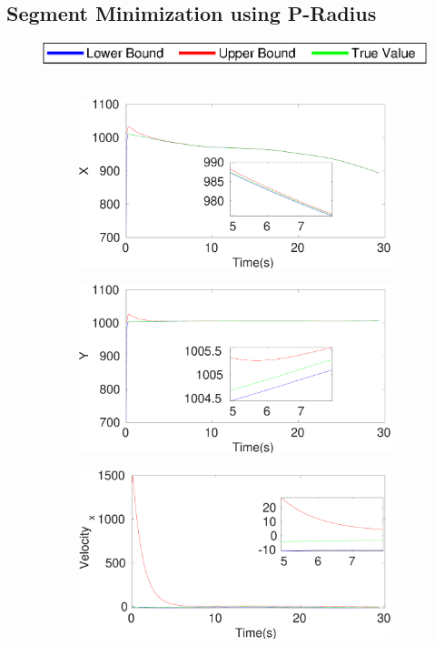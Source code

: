 \clearpage
\subsection{Segment Minimization using P-Radius}
\FloatBarrier
\begin{figure}[h]
\includegraphics[scale=0.8]{figures/legend}\\\\
\begin{subfigure}{.5\linewidth}
\centering
\includegraphics[width=\linewidth]{figures/Prad/s3cvpradX}
\end{subfigure}
\begin{subfigure}{.5\linewidth}
\centering
\includegraphics[width=\linewidth]{figures/Prad/s3cvpradY}
\end{subfigure}
\begin{subfigure}{.5\linewidth}
\centering
\includegraphics[width=\linewidth]{figures/Prad/s3cvpradVelocity_x}

\end{subfigure}
\end{figure}
